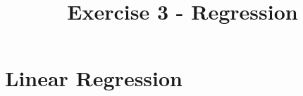 
\usepackage{hyperref}

\title{Exercise 3 - Regression}


\AddToShipoutPicture*{\BackgroundPic}

\maketitle
\medskip
\newpage

\section{Linear Regression}

